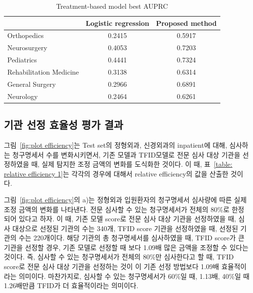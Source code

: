 \documentclass[11pt]{article}           %
\begin{document}
\begin{table}[]
    \centering
    \caption{Treatment-based model best AUPRC}
    \vspace{0.5cm}
    \label{table: AUPRC}
    \begin{tabular}{@{}lcc@{}}
    \toprule
                            & \multicolumn{1}{l}{Logistic regression} & \multicolumn{1}{l}{Proposed method} \\ \midrule
    Orthopedics             & 0.2415                                  & 0.5917                              \\ 
    Neurosurgery            & 0.4053                                  & 0.7203                              \\ 
    Pediatrics              & 0.4441                                  & 0.7324                              \\ 
    Rehabilitation Medicine & 0.3138                                  & 0.6314                              \\ 
    General Surgery         & 0.2966                                  & 0.6891                              \\ 
    Neurology               & 0.2464                                  & 0.6261                              \\ \bottomrule
    \end{tabular}
\end{table}




\subsection{기관 선정 효율성 평가 결과}
\label{5.2}
그림~\ref{fig:plot efficiency}는 Test set의 정형외과, 신경외과의 inpatient에 대해, 심사하는 청구명세서 수를 변화시키면서, 기존 모델과 TFID모델로 전문 심사 대상 기관을 선정하였을 때, 실제 탐지한 조정 금액의 변화를 도식화한 것이다.
이 때, 표~\ref{table: relative efficiency 1}는 각각의 경우에 대해서 relative efficiency의 값을 산출한 것이다.

그림~\ref{fig:plot efficiency}의 a)는 정형외과 입원환자의 청구명세서 심사량에 따른 실제 조정 금액의 변화를 나타낸다.
전문 심사할 수 있는 청구명세서가 전체의 80\%로 한정되어 있다고 하자.
이 때, 기존 모델 score로 전문 심사 대상 기관을 선정하였을 때, 심사 대상으로 선정된 기관의 수는 340개, TFID score 기관을 선정하였을 때, 선정된 기관의 수는 220개이다.
해당 기관의 총 청구명세서를 심사하였을 때, TFID score가 큰 기관을 선정할 경우, 기존 모델로 선정할 때 보다 1.09배 많은 금액을 조정할 수 있다는 것이다.
즉, 심사할 수 있는 청구명세서가 전체의 80\%만 심사한다고 할 때, TFID score로 전문 심사 대상 기관을 선정하는 것이 이 기존 선정 방법보다 1.09배 효율적이라는 의미이다.
마찬가지로, 심사할 수 있는 청구명세서가 60\%일 때, 1.13배, 40\%일 때 1.26배만큼 TFID가 더 효율적이라는 의미이다.
\end{document}
